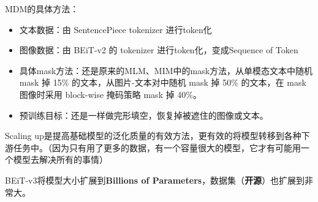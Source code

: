 \documentclass[zihao=false,fontset=windows]{ctexart}
\begin{document}
MDM的具体方法：\par
\begin{itemize}
\item 文本数据：由 SentencePiece tokenizer 进行token化
\item 图像数据：由 BEiT-v2 的 tokenizer 进行token化，变成Sequence of Token
\item 具体mask方法：还是原来的MLM、MIM中的mask方法，从单模态文本中随机 mask 掉 15\% 的文本，从图片-文本对中随机 mask 掉 50\% 的文本，在 mask 图像时采用 block-wise 掩码策略 mask 掉 40\%。
\item 预训练目标：还是一样做完形填空，恢复掉被遮住的图像或文本。
\end{itemize}

\par\vspace{1.15em}\par\vspace{0.28em}

Scaling up是提高基础模型的泛化质量的有效方法，更有效的将模型转移到各种下游任务中。（因为只有用了更多的数据，有一个容量很大的模型，它才有可能用一个模型去解决所有的事情）\par

BEiT-v3将模型大小扩展到\textbf{Billions of Parameters}，数据集（\textbf{开源}）也扩展到非常大。\par
\end{document}
